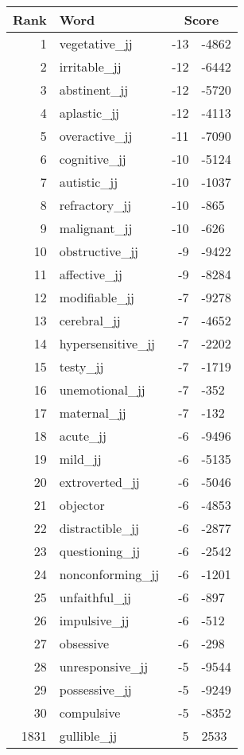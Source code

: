 \begin{longtable}[!htbp]{| rlr@{.}l |}
    \hline
    \textbf{Rank} & \textbf{Word} & \multicolumn{2}{c|}{\textbf{Score}} \\
    \hline
    \endhead
    1 & vegetative\_jj & -13 & -4862 \\
    2 & irritable\_jj & -12 & -6442 \\
    3 & abstinent\_jj & -12 & -5720 \\
    4 & aplastic\_jj & -12 & -4113 \\
    5 & overactive\_jj & -11 & -7090 \\
    6 & cognitive\_jj & -10 & -5124 \\
    7 & autistic\_jj & -10 & -1037 \\
    8 & refractory\_jj & -10 & -865 \\
    9 & malignant\_jj & -10 & -626 \\
    10 & obstructive\_jj & -9 & -9422 \\
    11 & affective\_jj & -9 & -8284 \\
    12 & modifiable\_jj & -7 & -9278 \\
    13 & cerebral\_jj & -7 & -4652 \\
    14 & hypersensitive\_jj & -7 & -2202 \\
    15 & testy\_jj & -7 & -1719 \\
    16 & unemotional\_jj & -7 & -352 \\
    17 & maternal\_jj & -7 & -132 \\
    18 & acute\_jj & -6 & -9496 \\
    19 & mild\_jj & -6 & -5135 \\
    20 & extroverted\_jj & -6 & -5046 \\
    21 & objector & -6 & -4853 \\
    22 & distractible\_jj & -6 & -2877 \\
    23 & questioning\_jj & -6 & -2542 \\
    24 & nonconforming\_jj & -6 & -1201 \\
    25 & unfaithful\_jj & -6 & -897 \\
    26 & impulsive\_jj & -6 & -512 \\
    27 & obsessive & -6 & -298 \\
    28 & unresponsive\_jj & -5 & -9544 \\
    29 & possessive\_jj & -5 & -9249 \\
    30 & compulsive & -5 & -8352 \\
    1831 & gullible\_jj & 5 & 2533 \\

\end{longtable}
